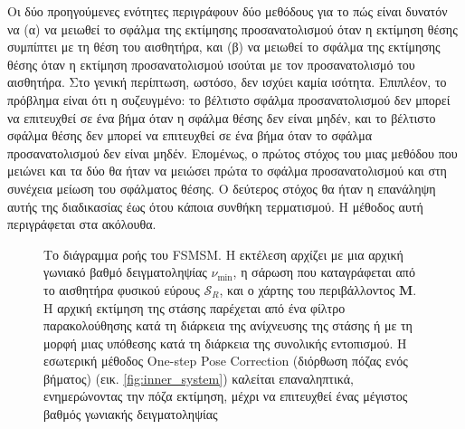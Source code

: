 Οι δύο προηγούμενες ενότητες περιγράφουν δύο μεθόδους για το πώς είναι δυνατόν
να (α) να μειωθεί το σφάλμα της εκτίμησης προσανατολισμού όταν η εκτίμηση θέσης
συμπίπτει με τη θέση του αισθητήρα, και (β) να μειωθεί το σφάλμα της εκτίμησης
θέσης όταν η εκτίμηση προσανατολισμού ισούται με τον προσανατολισμό του
αισθητήρα. Στο γενική περίπτωση, ωστόσο, δεν ισχύει καμία ισότητα. Επιπλέον, το
πρόβλημα είναι ότι η συζευγμένο: το βέλτιστο σφάλμα προσανατολισμού δεν μπορεί
να επιτευχθεί σε ένα βήμα όταν η σφάλμα θέσης δεν είναι μηδέν, και το βέλτιστο
σφάλμα θέσης δεν μπορεί να επιτευχθεί σε ένα βήμα όταν το σφάλμα
προσανατολισμού δεν είναι μηδέν. Επομένως, ο πρώτος στόχος του μιας μεθόδου που
μειώνει και τα δύο θα ήταν να μειώσει πρώτα το σφάλμα προσανατολισμού και στη
συνέχεια μείωση του σφάλματος θέσης. Ο δεύτερος στόχος θα ήταν η επανάληψη
αυτής της διαδικασίας έως ότου κάποια συνθήκη τερματισμού. Η μέθοδος αυτή
περιγράφεται στα ακόλουθα.

\begin{figure}[]\centering
  
  \caption{\small Το διάγραμμα ροής του FSMSM. Η εκτέλεση αρχίζει με μια αρχική
           γωνιακό βαθμό δειγματοληψίας $\nu_{\min}$, η σάρωση που καταγράφεται
           από το αισθητήρα φυσικού εύρους $\mathcal{S}_R$, και ο χάρτης του
           περιβάλλοντος $\bm{M}$. Η αρχική εκτίμηση της στάσης παρέχεται από
           ένα φίλτρο παρακολούθησης κατά τη διάρκεια της ανίχνευσης της στάσης
           ή με τη μορφή μιας υπόθεσης κατά τη διάρκεια της συνολικής
           εντοπισμού. Η εσωτερική μέθοδος One-step Pose Correction (διόρθωση
           πόζας ενός βήματος) (εικ.  \ref{fig:inner_system}) καλείται
           επαναληπτικά, ενημερώνοντας την πόζα εκτίμηση, μέχρι να επιτευχθεί
           ένας μέγιστος βαθμός γωνιακής δειγματοληψίας}
  \label{fig:outer_system}
\end{figure}


